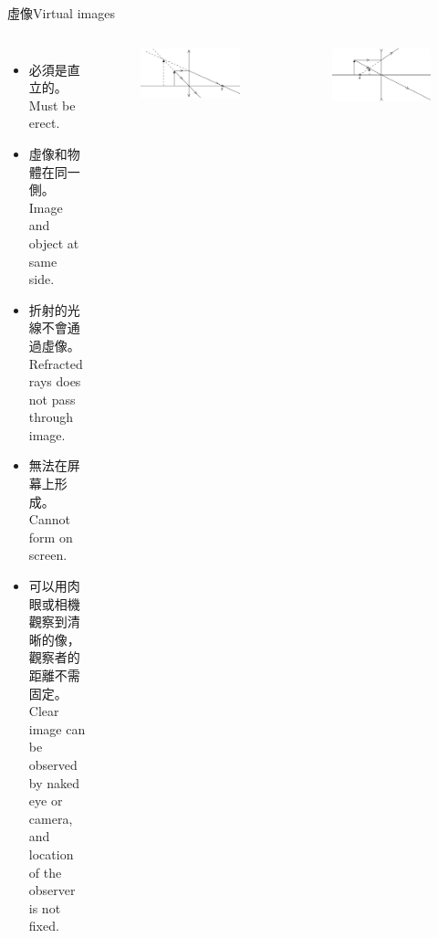 \documentclass[beamer=true]{standalone}
\begin{document}
\begin{frame}{虛像Virtual images}
    \begin{columns}
        \begin{itemize}
            \setlength{\itemsep}{.6em}
            \item 必須是直立的。\\Must be erect.
            \item 虛像和物體在同一側。\\Image and object at same side.
            \item 折射的光線不會通過虛像。Refracted rays does not pass through image.
            \item 無法在屏幕上形成。\\Cannot form on screen.
            \item 可以用肉眼或相機觀察到清晰的像，觀察者的距離不需固定。\\Clear image can be observed by naked eye or camera, and location of the observer is not fixed.
        \end{itemize}
        \begin{figure}
            \centering
            \includegraphics[width=1\linewidth]{assets/unxu9d32.png}
        \end{figure}\bigskip
        \begin{figure}
            \centering
            \includegraphics[width=\linewidth]{assets/dn1d33d.png}
        \end{figure}


\end{columns}
\end{frame}
\end{document}
